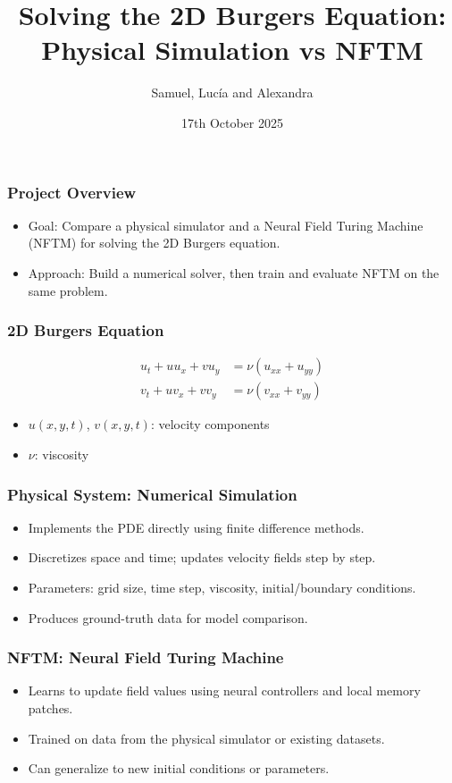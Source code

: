 \documentclass{beamer}
\title{Solving the 2D Burgers Equation: Physical Simulation vs NFTM}
\author{Samuel, Lucía and Alexandra}
\date{17th October 2025}
\begin{document}

\begin{frame}
\frametitle{Project Overview}
\begin{itemize}
  \item Goal: Compare a physical simulator and a Neural Field Turing Machine (NFTM) for solving the 2D Burgers equation.
  \item Approach: Build a numerical solver, then train and evaluate NFTM on the same problem.
\end{itemize}
\end{frame}


\begin{frame}
\frametitle{2D Burgers Equation}
\begin{align*}
  u_t + u u_x + v u_y &= \nu (u_{xx} + u_{yy}) \\
  v_t + u v_x + v v_y &= \nu (v_{xx} + v_{yy})
\end{align*}
\begin{itemize}
  \item $u(x, y, t)$, $v(x, y, t)$: velocity components
  \item $\nu$: viscosity
\end{itemize}
\end{frame}


\begin{frame}
\frametitle{Physical System: Numerical Simulation}
\begin{itemize}
  \item Implements the PDE directly using finite difference methods.
  \item Discretizes space and time; updates velocity fields step by step.
  \item Parameters: grid size, time step, viscosity, initial/boundary conditions.
  \item Produces ground-truth data for model comparison.
\end{itemize}
\end{frame}


\begin{frame}
\frametitle{NFTM: Neural Field Turing Machine}
\begin{itemize}
  \item Learns to update field values using neural controllers and local memory patches.
  \item Trained on data from the physical simulator or existing datasets.
  \item Can generalize to new initial conditions or parameters.
\end{itemize}
\end{frame}
\end{document}
